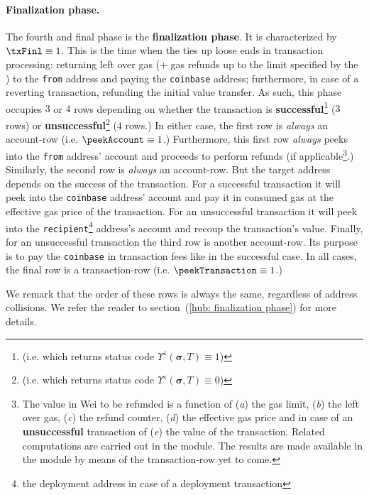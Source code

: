 \paragraph*{Finalization phase.}
The fourth and final phase is the \textbf{finalization phase}.
It is characterized by $\txFinl \equiv 1$.
This is the time when the \zkEvm{} ties up loose ends in transaction processing:
returning left over gas (+ gas refunds up to the limit specified by the \cite{EYP-London}) to the \texttt{from} address and paying the \texttt{coinbase} address;
furthermore, in case of a reverting transaction, refunding the initial value transfer.
As such, this phase occupies $3$ or $4$ rows depending on whether the transaction is
\textbf{successful}\footnote{(i.e. which returns status code $\Upsilon^{z}(\bm{\sigma}, T) \equiv 1$)} ($3$ rows) or
\textbf{unsuccessful}\footnote{(i.e. which returns status code $\Upsilon^{z}(\bm{\sigma}, T) \equiv 0$)} ($4$ rows.)
In either case, the first row is \emph{always} an account-row (i.e. $\peekAccount \equiv 1$.)
Furthermore, this first row \emph{always} peeks into the \texttt{from} address' account and proceeds to perform refunds
(if applicable\footnote{The value in Wei to be refunded is a function of
(\emph{a}) the gas limit,
(\emph{b}) the left over gas,
(\emph{c}) the refund counter,
(\emph{d}) the effective gas price and in case of an \textbf{unsuccessful} transaction of
(\emph{e}) the value of the transaction.
Related computations are carried out in the \txnDataMod{} module.
The results are made available in the \hubMod{} module by means of the transaction-row yet to come.}.)
Similarly, the second row is \emph{always} an account-row.
But the target address depends on the success of the transaction.
For a successful transaction it will peek into the \texttt{coinbase} address' account and pay it in consumed gas at the effective gas price of the transaction.
For an unsuccessful transaction it will peek into the \texttt{recipient}\footnote{the deployment address in case of a deployment transaction} address's account
and recoup the transaction's value.
Finally, for an unsuccessful transaction the third row is another account-row.
Its purpose is to pay the \texttt{coinbase} in transaction fees like in the successful case.
In all cases, the final row is a transaction-row (i.e. $\peekTransaction \equiv 1$.)

\saNote{}
We remark that the order of these rows is always the same, regardless of address collisions.
We refer the reader to section~(\ref{hub: finalization phase}) for more details.

